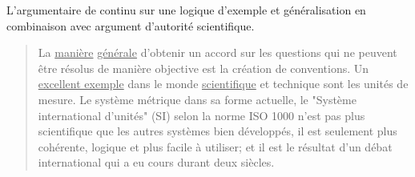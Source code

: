 L'argumentaire de \citeauthor{klopffer_subjective_1998} continu sur une logique d'exemple et généralisation en combinaison avec argument d'autorité scientifique.
\blockcquote[traduction, termes personnellement soulignés]{klopffer_subjective_1998}{
La \underline{manière} \underline{générale} d'obtenir un accord sur les questions qui ne peuvent être résolus de manière objective est la création de conventions.
Un \underline{excellent exemple} dans le monde \underline{scientifique} et technique sont les unités de mesure.
Le système métrique dans sa forme actuelle, le "Système international d'unités" (SI) selon la norme ISO 1000 n'est pas plus scientifique que les autres systèmes bien développés, il est seulement plus cohérente, logique et plus facile à utiliser; et il est le résultat d'un débat international qui a eu cours durant deux siècles.
%
}

